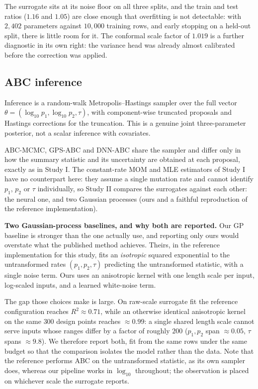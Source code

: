 \documentclass[sn-basic,iicol,pdflatex]{sn-jnl}
\begin{document}
The surrogate sits at its noise floor on all three splits, and the train and
test ratios ($1.16$ and $1.05$) are close enough that overfitting is not
detectable: with $2{,}402$ parameters against $10{,}000$ training rows, and
early stopping on a held-out split, there is little room for it. The conformal
scale factor of $1.019$ is a further diagnostic in its own right: the variance
head was already almost calibrated before the correction was applied.

\subsection{ABC inference}
\label{sec:sim3D_abc}

\begin{sloppypar}
Inference is a random-walk Metropolis--Hastings sampler over the full vector
$\theta = (\log_{10}p_1, \log_{10}p_2, \tau)$, with component-wise truncated
proposals and Hastings corrections for the truncation. This is a genuine joint
three-parameter posterior, not a scalar inference with covariates.
\end{sloppypar}

ABC-MCMC, GPS-ABC and DNN-ABC share the sampler and differ only in how the
summary statistic and its uncertainty are obtained at each proposal, exactly as
in Study I. The constant-rate MOM and MLE estimators of Study I have no
counterpart here: they assume a single mutation rate and cannot identify
$p_1$, $p_2$ or $\tau$ individually, so Study II compares the surrogates
against each other: the neural one, and two Gaussian processes (ours and a
faithful reproduction of the reference implementation).

\noindent\textbf{Two Gaussian-process baselines, and why both are reported.} Our GP
baseline is stronger than the one \citeauthor{lu2023} actually use, and reporting
only ours would overstate what the published method achieves. Theirs, in the
reference implementation for this study, fits an \emph{isotropic} squared
exponential to the untransformed rates $(p_1,p_2,\tau)$ predicting the
untransformed statistic, with a single noise term. Ours uses an anisotropic
kernel with one length scale per input, log-scaled inputs, and a learned
white-noise term.

The gap those choices make is large. On raw-scale surrogate fit the reference
configuration reaches $R^2 \approx 0.71$, while an otherwise identical
anisotropic kernel on the same $300$ design points reaches $\approx 0.99$: a
single shared length scale cannot serve inputs whose ranges differ by a factor
of roughly $200$ ($p_1, p_2$ span $\approx 0.05$, $\tau$ spans $\approx 9.8$).
We therefore report both, fit from the same rows under the same budget so that
the comparison isolates the model rather than the data. Note that the reference
performs ABC on the untransformed statistic, as its own sampler does, whereas
our pipeline works in $\log_{10}$ throughout; the observation is placed on
whichever scale the surrogate reports.
\end{document}
